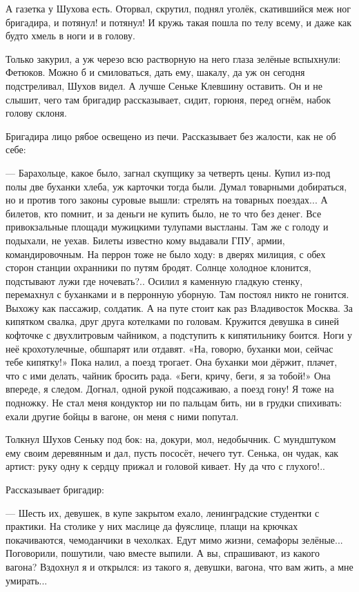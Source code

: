 А газетка у Шухова есть. Оторвал, скрутил, поднял уголёк, скатившийся меж ног бригадира, \dash и
потянул! и потянул! И кружь такая пошла по телу всему, и даже как будто хмель в ноги и в голову.

Только закурил, а уж черезо всю растворную на него глаза зелёные вспыхнули: Фетюков. Можно б
и смиловаться, дать ему, шакалу, да уж он сегодня подстреливал, Шухов видел. А лучше Сеньке
Клевшину оставить. Он и не слышит, чего там бригадир рассказывает, сидит, горюня, перед огнём,
набок голову склоня.

Бригадира лицо рябое освещено из печи. Рассказывает без жалости, как не об себе:

--- Барахольце, какое было, загнал скупщику за четверть цены. Купил из-под полы две буханки
хлеба, уж карточки тогда были. Думал товарными добираться, но и против того законы суровые
вышли: стрелять на товарных поездах... А билетов, кто помнит, и за деньги не купить было, не то
что без денег. Все привокзальные площади мужицкими тулупами выстланы. Там же с голоду и
подыхали, не уехав. Билеты известно кому выдавали \dash ГПУ, армии, командировочным. На перрон
тоже не было ходу: в дверях милиция, с обех сторон станции охранники по путям бродят. Солнце
холодное клонится, подстывают лужи \dash где ночевать?.. Осилил я каменную гладкую стенку,
перемахнул с буханками \dash и в перронную уборную. Там постоял \dash никто не гонится. Выхожу как
пассажир, солдатик. А на путе стоит как раз Владивосток \dash Москва. За кипятком \dash свалка, друг
друга котелками по головам. Кружится девушка в синей кофточке с двухлитровым чайником, а
подступить к кипятильнику боится. Ноги у неё крохотулечные, обшпарят или отдавят. «На,
говорю, буханки мои, сейчас тебе кипятку!» Пока налил, а поезд трогает. Она буханки мои
дёржит, плачет, что с ими делать, чайник бросить рада. «Беги, кричу, беги, я за тобой!» Она
впереде, я следом. Догнал, одной рукой подсаживаю, \dash а поезд гону! Я \dash тоже на подножку. Не
стал меня кондуктор ни по пальцам бить, ни в грудки спихивать: ехали другие бойцы в вагоне, он
меня с ними попутал.

Толкнул Шухов Сеньку под бок: на, докури, мол, недобычник. С мундштуком ему своим деревянным и
дал, пусть пососёт, нечего тут. Сенька, он чудак, как артист: руку одну к сердцу прижал и
головой кивает. Ну да что с глухого!..

Рассказывает бригадир:

--- Шесть их, девушек, в купе закрытом ехало, ленинградские студентки с практики. На столике у
них маслице да фуяслице, плащи на крючках покачиваются, чемоданчики в чехолках. Едут мимо
жизни, семафоры зелёные... Поговорили, пошутили, чаю вместе выпили. А вы, спрашивают, из какого
вагона? Вздохнул я и открылся: из такого я, девушки, вагона, что вам жить, а мне умирать...

